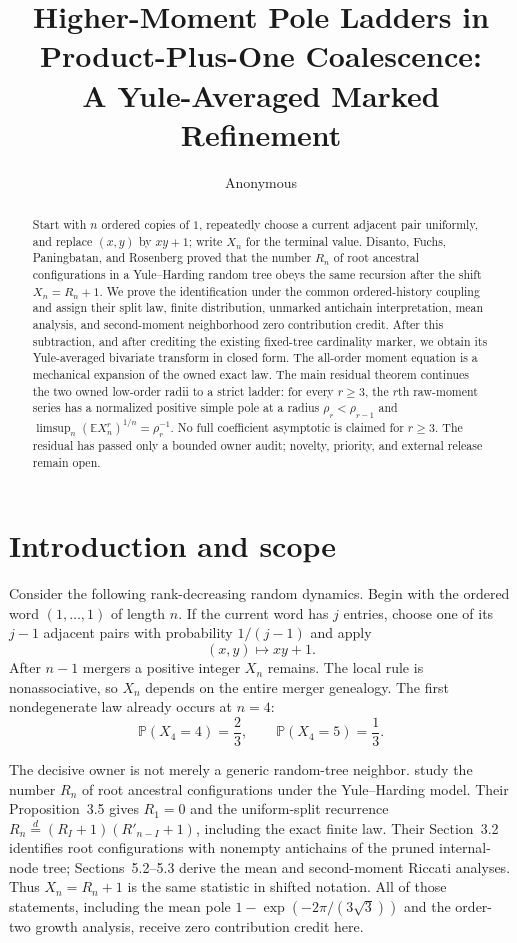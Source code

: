 \documentclass[10pt,a4paper]{amsart}
\title[Higher-moment poles in coalescence]{Higher-Moment Pole Ladders in Product-Plus-One Coalescence:\\A Yule-Averaged Marked Refinement}
\author{Anonymous}
\date{}
\theoremstyle{definition}
\theoremstyle{remark}
\newcommand{\E}{\mathbb E}
\newcommand{\Pp}{\mathbb P}
\begin{document}
\begin{abstract}
Start with $n$ ordered copies of $1$, repeatedly choose a current adjacent
pair uniformly, and replace $(x,y)$ by $xy+1$; write $X_n$ for the terminal
value.  Disanto, Fuchs, Paningbatan, and Rosenberg proved that the number
$R_n$ of root ancestral configurations in a Yule--Harding random tree obeys
the same recursion after the shift $X_n=R_n+1$.  We prove the identification
under the common ordered-history coupling and assign their split law, finite
distribution, unmarked antichain interpretation, mean analysis, and
second-moment neighborhood zero contribution credit.  After this
subtraction, and after crediting the existing fixed-tree cardinality marker,
we obtain its Yule-averaged bivariate transform in closed form.  The
all-order moment equation is a mechanical expansion of the owned exact law.
The main residual theorem continues the two owned low-order radii to a strict ladder:
for every $r\geq3$, the $r$th raw-moment series has a normalized positive
simple pole at a radius $\rho_r<\rho_{r-1}$ and
$\limsup_n(\E X_n^r)^{1/n}=\rho_r^{-1}$.  No full coefficient asymptotic is
claimed for $r\geq3$.  The residual has passed only a bounded owner
audit; novelty, priority, and external release remain open.
\end{abstract}

\maketitle

\section{Introduction and scope}

Consider the following rank-decreasing random dynamics.  Begin with the
ordered word $(1,\ldots,1)$ of length $n$.  If the current word has $j$
entries, choose one of its $j-1$ adjacent pairs with probability $1/(j-1)$
and apply
\begin{equation}\label{eq:merge}
                 (x,y)\longmapsto xy+1.
\end{equation}
After $n-1$ mergers a positive integer $X_n$ remains.  The local rule is
nonassociative, so $X_n$ depends on the entire merger genealogy.  The first
nondegenerate law already occurs at $n=4$:
\[
        \Pp(X_4=4)=\frac23,\qquad \Pp(X_4=5)=\frac13.
\]

The decisive owner is not merely a generic random-tree neighbor.
\citet{DisantoEtAl2022} study the number $R_n$ of root ancestral
configurations under the Yule--Harding model.  Their Proposition~3.5 gives
$R_1=0$ and the uniform-split recurrence
$R_n\overset d=(R_I+1)(R'_{n-I}+1)$, including the exact finite law.  Their
Section~3.2 identifies root configurations with nonempty antichains of the
pruned internal-node tree; Sections~5.2--5.3 derive the mean and
second-moment Riccati analyses.  Thus $X_n=R_n+1$ is the same statistic in
shifted notation.  All of those statements, including the mean pole
$1-\exp(-2\pi/(3\sqrt3))$ and the order-two growth analysis, receive zero
contribution credit here.
\end{document}
